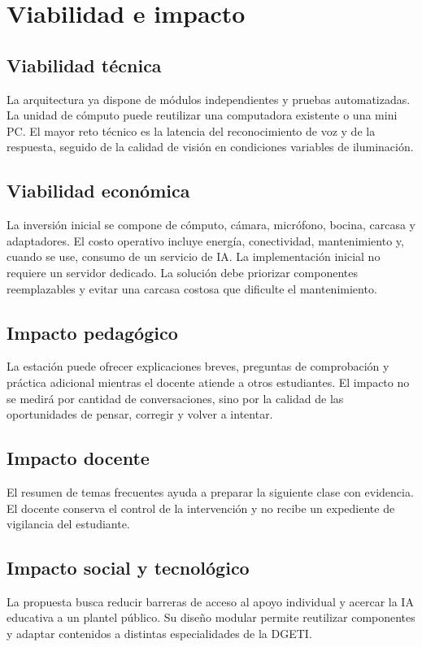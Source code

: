 \documentclass[letterpaper,11pt]{article}
\begin{document}
\clearpage

\section{Viabilidad e impacto}

\subsection{Viabilidad técnica}
La arquitectura ya dispone de módulos independientes y pruebas automatizadas. La unidad de cómputo puede reutilizar una computadora existente o una mini PC. El mayor reto técnico es la latencia del reconocimiento de voz y de la respuesta, seguido de la calidad de visión en condiciones variables de iluminación.

\subsection{Viabilidad económica}
La inversión inicial se compone de cómputo, cámara, micrófono, bocina, carcasa y adaptadores. El costo operativo incluye energía, conectividad, mantenimiento y, cuando se use, consumo de un servicio de IA. La implementación inicial no requiere un servidor dedicado. La solución debe priorizar componentes reemplazables y evitar una carcasa costosa que dificulte el mantenimiento.

\subsection{Impacto pedagógico}
La estación puede ofrecer explicaciones breves, preguntas de comprobación y práctica adicional mientras el docente atiende a otros estudiantes. El impacto no se medirá por cantidad de conversaciones, sino por la calidad de las oportunidades de pensar, corregir y volver a intentar.

\subsection{Impacto docente}
El resumen de temas frecuentes ayuda a preparar la siguiente clase con evidencia. El docente conserva el control de la intervención y no recibe un expediente de vigilancia del estudiante.

\subsection{Impacto social y tecnológico}
La propuesta busca reducir barreras de acceso al apoyo individual y acercar la IA educativa a un plantel público. Su diseño modular permite reutilizar componentes y adaptar contenidos a distintas especialidades de la DGETI.
\end{document}
